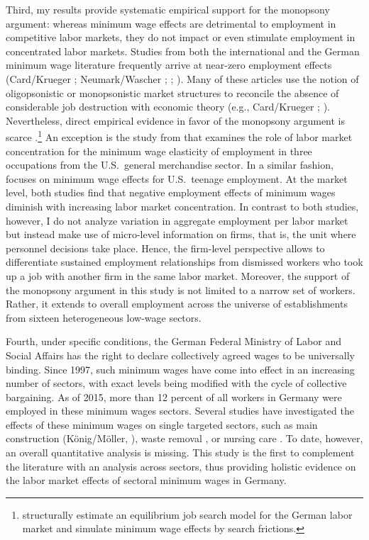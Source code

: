 \documentclass[11pt,oneside,reqno,xcolor=dvipsnames]{article} %
\begin{document}
Third, my results provide systematic empirical support for the monopsony argument: whereas minimum wage effects are detrimental to employment in competitive labor markets, they do not impact or even stimulate employment in concentrated labor markets. Studies from both the international and the German minimum wage literature frequently arrive at near-zero employment effects (Card/Krueger \citeyear{CardKrueger1995}; Neumark/Wascher \citeyear{NeumarkWascher2008}; \citealp{Moeller2012}; \citealp{CaliendoEtAl2019}). Many of these articles use the notion of oligopsonistic or monopsonistic market structures to reconcile the absence of considerable job destruction with economic theory (e.g., Card/Krueger \citeyear{CardKrueger1994}; \citealp{DustmannEtAl2021}). Nevertheless, direct empirical evidence in favor of the monopsony argument is scarce \citep{Neumark2019}.\footnote{\citet{BloemerEtAl2018} structurally estimate an equilibrium job search model for the German labor market and simulate minimum wage effects by search frictions.} An exception is the study from \citet{AzarEtAl2019a} that examines the role of labor market concentration for the minimum wage elasticity of employment in three occupations from the U.S.\ general merchandise sector. In a similar fashion, \citet{Munguia2020} focuses on minimum wage effects for U.S.\ teenage employment. At the market level, both studies find that negative employment effects of minimum wages diminish with increasing labor market concentration. In contrast to both studies, however, I do not analyze variation in aggregate employment per labor market but instead make use of micro-level information on firms, that is, the unit where personnel decisions take place. Hence, the firm-level perspective allows to differentiate sustained employment relationships from dismissed workers who took up a job with another firm in the same labor market. Moreover, the support of the monopsony argument in this study is not limited to a narrow set of workers. Rather, it extends to overall employment across the universe of establishments from sixteen heterogeneous low-wage sectors.





Fourth, under specific conditions, the German Federal Ministry of Labor and Social Affairs has the right to declare collectively agreed wages to be universally binding. Since 1997, such minimum wages have come into effect in an increasing number of sectors, with exact levels being modified with the cycle of collective bargaining. As of 2015, more than 12 percent of all workers in Germany were employed in these minimum wages sectors. Several studies have investigated the effects of these minimum wages on single targeted sectors, such as main construction (König/Möller, \citeyear{KoenigMoeller2009}), waste removal \citep{EgelnEtAl2011}, or nursing care \citep{BoockmannEtAl2011c}. To date, however, an overall quantitative analysis is missing. This study is the first to complement the literature with an analysis across sectors, thus providing holistic evidence on the labor market effects of sectoral minimum wages in Germany.
\end{document}
